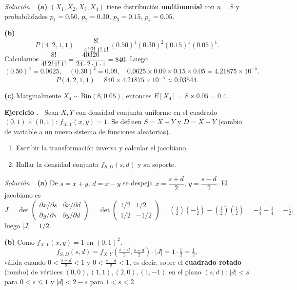\documentclass[11pt,a4paper]{article}
\newcounter{ejnum}
\newenvironment{ejercicio}{\refstepcounter{ejnum}\par\medskip\noindent\textbf{Ejercicio \theejnum.}~}{\par}
\newenvironment{solucion}{\par\noindent\textit{Solución.}~}{\par\vspace{1em}}
\begin{document}
\begin{solucion}
\textbf{(a)} $(X_1,X_2,X_3,X_4)$ tiene distribución \textbf{multinomial} con $n=8$ y probabilidades $p_1=0.50$, $p_2=0.30$, $p_3=0.15$, $p_4=0.05$.

\textbf{(b)}
\[
P(4,2,1,1) = \frac{8!}{4!\,2!\,1!\,1!}\,(0.50)^4(0.30)^2(0.15)^1(0.05)^1.
\]
Calculamos $\dfrac{8!}{4!\,2!\,1!\,1!} = \dfrac{40320}{24\cdot2\cdot1\cdot1} = 840$. Luego
\[
(0.50)^4=0.0625, \quad (0.30)^2=0.09, \quad 0.0625\times0.09\times0.15\times0.05 = 4.21875\times10^{-5}.
\]
\[
P(4,2,1,1) = 840 \times 4.21875\times10^{-5} \approx 0.03544.
\]

\textbf{(c)} Marginalmente $X_4\sim\text{Bin}(8, 0.05)$, entonces $E[X_4] = 8\times0.05 = 0.4$.
\end{solucion}

\begin{ejercicio}
Sean $X,Y$ con densidad conjunta uniforme en el cuadrado $(0,1)\times(0,1)$: $f_{X,Y}(x,y)=1$. Se definen $S=X+Y$ y $D=X-Y$ (cambio de variable a un nuevo sistema de funciones aleatorias).
\begin{enumerate}[label=(\alph*)]
\item Escribir la transformación inversa y calcular el jacobiano.
\item Hallar la densidad conjunta $f_{S,D}(s,d)$ y su soporte.
\end{enumerate}
\end{ejercicio}

\begin{solucion}
\textbf{(a)} De $s=x+y$, $d=x-y$ se despeja $x = \dfrac{s+d}{2}$, $y=\dfrac{s-d}{2}$. El jacobiano es
\[
J = \det\begin{pmatrix} \partial x/\partial s & \partial x/\partial d \\ \partial y/\partial s & \partial y/\partial d\end{pmatrix} = \det\begin{pmatrix} 1/2 & 1/2 \\ 1/2 & -1/2\end{pmatrix} = \left(\tfrac12\right)\left(-\tfrac12\right) - \left(\tfrac12\right)\left(\tfrac12\right) = -\tfrac14-\tfrac14 = -\tfrac12,
\]
luego $|J|=1/2$.

\textbf{(b)} Como $f_{X,Y}(x,y)=1$ en $(0,1)^2$,
\[
f_{S,D}(s,d) = f_{X,Y}\left(\tfrac{s+d}{2},\tfrac{s-d}{2}\right)\cdot|J| = 1\cdot\tfrac12 = \tfrac12,
\]
válida cuando $0<\tfrac{s+d}{2}<1$ y $0<\tfrac{s-d}{2}<1$, es decir, sobre el \textbf{cuadrado rotado} (rombo) de vértices $(0,0),(1,1),(2,0),(1,-1)$ en el plano $(s,d)$: $|d|<s$ para $0<s\le1$ y $|d|<2-s$ para $1<s<2$.
\end{solucion}
\end{document}
